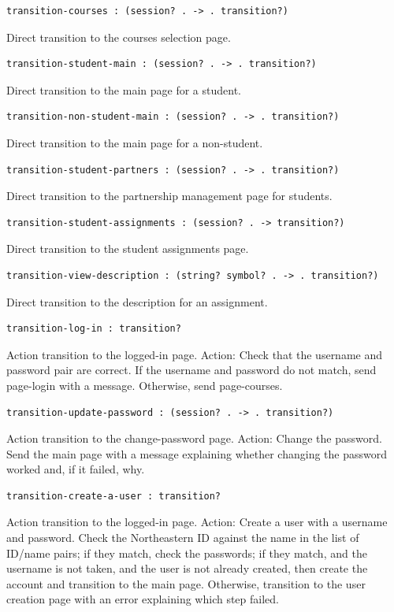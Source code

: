 \documentclass[a4paper]{article}
\begin{document}
\begin{verbatim}
transition-courses : (session? . -> . transition?)
\end{verbatim}
Direct transition to the courses selection page.

\begin{verbatim}
transition-student-main : (session? . -> . transition?)
\end{verbatim}
Direct transition to the main page for a student.

\begin{verbatim}
transition-non-student-main : (session? . -> . transition?)
\end{verbatim}
Direct transition to the main page for a non-student.

\begin{verbatim}
transition-student-partners : (session? . -> . transition?)
\end{verbatim}
Direct transition to the partnership management page for students.

\begin{verbatim}
transition-student-assignments : (session? . -> transition?)
\end{verbatim}
Direct transition to the student assignments page.

\begin{verbatim}
transition-view-description : (string? symbol? . -> . transition?)
\end{verbatim}
Direct transition to the description for an assignment.

\begin{verbatim}
transition-log-in : transition?
\end{verbatim}
Action transition to the logged-in page.
Action: Check that the username and password pair are correct.
If the username and password do not match, send page-login with a message.
Otherwise, send page-courses.

\begin{verbatim}
transition-update-password : (session? . -> . transition?)
\end{verbatim}
Action transition to the change-password page.
Action: Change the password.
Send the main page with a message explaining whether changing the password
worked and, if it failed, why.

\begin{verbatim}
transition-create-a-user : transition?
\end{verbatim}
Action transition to the logged-in page.
Action: Create a user with a username and password.
Check the Northeastern ID against the name in the list of
ID/name pairs; if they match, check the passwords; if they
match, and the username is not taken, and the user is not
already created, then create the account and transition to
the main page. Otherwise, transition to the user
creation page with an error explaining which step failed.
\end{document}
